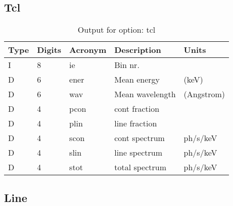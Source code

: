 \subsection{Tcl}

\begin{table}[!p]
\caption{Output for option: tcl}
\label{tabout:tcl}
\begin{tabular}{lllll}
\hline
Type & Digits & Acronym & Description & Units \\ 
\hline
I &  8 & ie   & Bin nr.                          &                  \\
D &  6 & ener & Mean energy                      & (keV)            \\
D &  6 & wav  & Mean wavelength                  & (Angstrom)       \\
D &  4 & pcon & cont fraction                    &                  \\
D &  4 & plin & line fraction                    &                  \\
D &  4 & scon & cont spectrum                    & ph/s/keV         \\
D &  4 & slin & line spectrum                    & ph/s/keV         \\
D &  4 & stot & total spectrum                   & ph/s/keV         \\
\hline
\end{tabular}
\end{table}

\subsection{Line}

